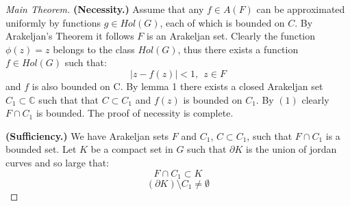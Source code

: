 \documentclass[12pt]{article}
\begin{document}
\begin{proof}[Main Theorem]


\textbf{(Necessity.)} Assume that any $f\in A(F)$ can be approximated uniformly by functions $g\in Hol(G)$, each of which is bounded on $C$. By Arakeljan's Theorem it follows $F$ is an Arakeljan set. Clearly the function $\phi(z)=z$ belongs to the class $Hol(G)$, thus there exists a function $f\in Hol(G)$ such that: \begin{equation}|z-f(z)|<1,\   \ z\in F  
\end{equation}and $f$ is also bounded on C.
 By {lemma 1} there exists a closed Arakeljan set $C_1\subset \mathbb{C}$ such that that $C\subset C_1$ and $f(z)$ is bounded on $C_1$. By $(1)$ clearly $F\cap C_1$ is bounded. The proof of necessity is complete.
 
 \noindent \textbf{(Sufficiency.)} We have Arakeljan sets $F$ and $C_1$, $C\subset C_1$, such that $F\cap C_1$ is a bounded set. Let $K$ be a compact set in $G$ such that $\partial K$ is the union of jordan curves and so large that:
 \begin{equation} 
  F\cap C_1\subset K
   \end{equation}
  \begin{equation}
  (\partial K)\setminus C_1\not=\emptyset
   \end{equation}


\end{proof}
\end{document}
